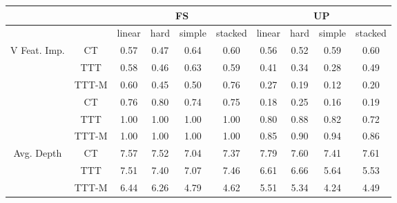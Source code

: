 \begin{table}
\begin{center}
\begin{tabular}{|c|c||c|c|c|c||c|c|c|c|}
\hline
    &  & \multicolumn{4}{|c||}{FS} &  \multicolumn{4}{|c|}{UP} \\
\hline
  &   & linear & hard & simple & stacked & linear & hard & simple & stacked \\
\hline
\hline
\multirow{4}{6em}{V Feat. Imp.} &    CT &   0.57 &    0.47 &      0.64 &       0.60 &   0.56 &    0.52 &      0.59 &       0.60  \\
 &   TTT &   0.58 &    0.46 &      0.63 &       0.59 &   0.41 &    0.34 &      0.28 &       0.49  \\
 & TTT-M &   0.60 &    0.45 &      0.50 &       0.76 &   0.27 &    0.19 &      0.12 &       0.20  \\
\hline
\hline
\multirow{4}{6em}{CI Coverage}  &    CT &   0.76 &    0.80 &      0.74 &       0.75 &   0.18 &    0.25 &      0.16 &       0.19  \\
  &   TTT &   1.00 &    1.00 &      1.00 &       1.00 &   0.80 &    0.88 &      0.82 &       0.72  \\
  & TTT-M &   1.00 &    1.00 &      1.00 &       1.00 &   0.85 &    0.90 &      0.94 &       0.86  \\
\hline
\hline
\multirow{4}{6em}{Avg. Depth}   &    CT &   7.57 &    7.52 &      7.04 &       7.37 &   7.79 &    7.60 &      7.41 &       7.61  \\
   &   TTT &   7.51 &    7.40 &      7.07 &       7.46 &   6.61 &    6.66 &      5.64 &       5.53  \\
   & TTT-M &   6.44 &    6.26 &      4.79 &       4.62 &   5.51 &    5.34 &      4.24 &       4.49  \\
\hline
\end{tabular}
\end{center}
\end{table}